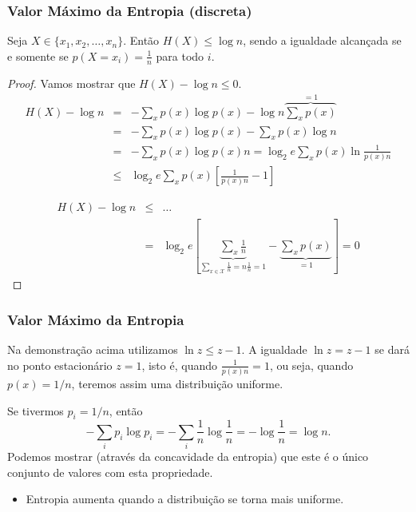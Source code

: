 \begin{frame}[allowframebreaks]
  \frametitle{Valor Máximo da Entropia (discreta)}
  \begin{theorem}
  Seja $X \in \{x_1, x_2, \ldots, x_n\}$. Então $H(X) \leq \log n$, sendo a igualdade
  alcançada se e somente se $p(X=x_i) = \frac{1}{n}$ para todo $i$. 
  \end{theorem}
  \framebreak
  \begin{proof}
  Vamos mostrar que $H(X) - \log n  \leq 0$.
    \begin{eqnarray}
    H(X) - \log n &=& - \sum_x p(x) \log p(x)  - \log n \overbrace{\sum_x p(x)}^{=1} \nonumber \\
        &=& - \sum_x p(x) \log p(x) - \sum_x p(x) \log n \nonumber \\
        &=& - \sum_x p(x) \log p(x) n = \log_2 e \sum_x p(x) \ln \frac{1}{p(x) n} \nonumber \\
        &\leq& \log_2 e \sum_x p(x) \left[ \frac{1}{p(x) n} -1 \right] \nonumber
    \end{eqnarray}

   \proofbreak
    \begin{eqnarray}
    H(X) - \log n &\leq& \ldots \nonumber \\
        &=& \log_2 e \left[ \underbrace{\sum_x \frac{1}{n}}_{\sum_{x \in \mathcal{X}} \frac{1}{n} = n \frac{1}{n} = 1} - \underbrace{\sum_x p(x)}_{=1} \right] = 0
    \end{eqnarray} 
  \end{proof} 
\end{frame}


\begin{frame}%
  \frametitle{Valor Máximo da Entropia}
  Na demonstração acima utilizamos $\ln z \leq z - 1$. A igualdade $\ln z = z-1$ se dará
  no ponto estacionário $z=1$, isto é, quando $\frac{1}{p(x) n} = 1$, ou seja,
  quando $p(x) = 1/n$, teremos assim uma distribuição uniforme.

  \vspace{1cm}
  Se tivermos $p_i = 1/n$, então
  \begin{equation}
  - \sum_i p_i \log p_i = - \sum_i \frac{1}{n} \log \frac{1}{n} = - \log \frac{1}{n} = \log n .
  \end{equation}
  Podemos mostrar (através da concavidade da entropia) que este é o único conjunto de valores com esta propriedade.

  \begin{itemize}
  \item Entropia aumenta quando a distribuição se torna mais uniforme.
  \end{itemize}
\end{frame}

